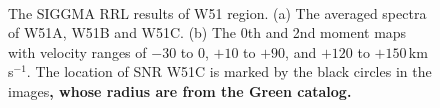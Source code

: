 \documentclass[manuscript]{aastex61}
\newcommand{\kms}{\,km\,s$^{-1}$}
\begin{document}
\begin{figure}[htbp]
\centering
{}
\\
\caption{The SIGGMA RRL results of W51 region. (a) The averaged spectra of W51A, W51B and W51C. (b) The 0th and 2nd moment maps with velocity ranges of $-30$ to $0$, $+10$ to $+90$, and $+120$ to $+150$\kms. The location of SNR W51C is marked by the black circles in the images\textbf{, whose radius are from the Green catalog.}}\label{w51_rrl}
\end{figure}
\end{document}
